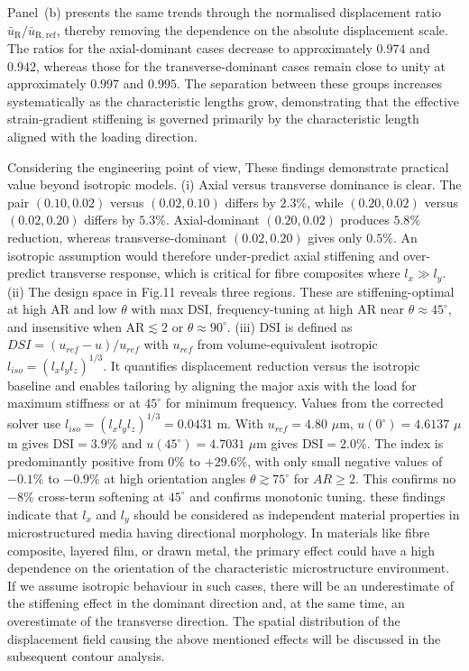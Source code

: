 \documentclass[final,3p,times,fleqn]{elsarticle}
\newcommand{\rev}[1]{\textcolor{revcolor}{#1}}
\begin{document}
Panel~(b) presents the same trends through the normalised displacement
ratio $\bar{u}_{\mathrm{R}}/\bar{u}_{\mathrm{R,ref}}$, thereby removing
the dependence on the absolute displacement scale.
The ratios for the axial-dominant cases decrease to approximately
$0.974$ and $0.942$, whereas those for the transverse-dominant cases
remain close to unity at approximately $0.997$ and $0.995$.
The separation between these groups increases systematically as the
characteristic lengths grow, demonstrating that the effective
strain-gradient stiffening is governed primarily by the characteristic
length aligned with the loading direction.

Considering the engineering point of view,
\rev{These findings demonstrate practical value beyond isotropic models. (i) Axial versus transverse dominance is clear. The pair $(0.10,0.02)$ versus $(0.02,0.10)$ differs by $2.3\%$, while $(0.20,0.02)$ versus $(0.02,0.20)$ differs by $5.3\%$. Axial-dominant $(0.20,0.02)$ produces $5.8\%$ reduction, whereas transverse-dominant $(0.02,0.20)$ gives only $0.5\%$. An isotropic assumption would therefore under-predict axial stiffening and over-predict transverse response, which is critical for fibre composites where $l_x\gg l_y$. (ii) The design space in Fig.11 reveals three regions. These are stiffening-optimal at high AR and low $\theta$ with max DSI, frequency-tuning at high AR near $\theta\approx45^\circ$, and insensitive when AR$\lesssim2$ or $\theta\approx90^\circ$. (iii) DSI is defined as $DSI=(u_{ref}-u)/u_{ref}$ with $u_{ref}$ from volume-equivalent isotropic $l_{iso}=(l_xl_yl_z)^{1/3}$. It quantifies displacement reduction versus the isotropic baseline and enables tailoring by aligning the major axis with the load for maximum stiffness or at $45^\circ$ for minimum frequency. Values from the corrected solver use $l_{iso}=(l_xl_yl_z)^{1/3}=0.0431$ m. With $u_{ref}=4.80$ $\mu$m, $u(0^\circ)=4.6137$ $\mu$m gives DSI$=3.9\%$ and $u(45^\circ)=4.7031$ $\mu$m gives DSI$=2.0\%$. The index is predominantly positive from $0\%$ to $+29.6\%$, with only small negative values of $-0.1\%$ to $-0.9\%$ at high orientation angles $\theta\gtrsim75^\circ$ for $AR\ge2$. This confirms no $-8\%$ cross-term softening at $45^\circ$ and confirms monotonic tuning.}
these findings indicate that $l_{x}$ and $l_{y}$ should be considered
as independent material properties in microstructured media having
directional morphology.
In materials like fibre composite, layered film, or drawn metal,
the primary effect could have a high dependence on the orientation
of the characteristic microstructure environment.
If we assume isotropic behaviour in such cases, there will be an
underestimate of the stiffening effect in the dominant direction and,
at the same time, an overestimate of the transverse direction.
The spatial distribution of the displacement field causing the above
mentioned effects will be discussed in the subsequent contour analysis.
\end{document}
